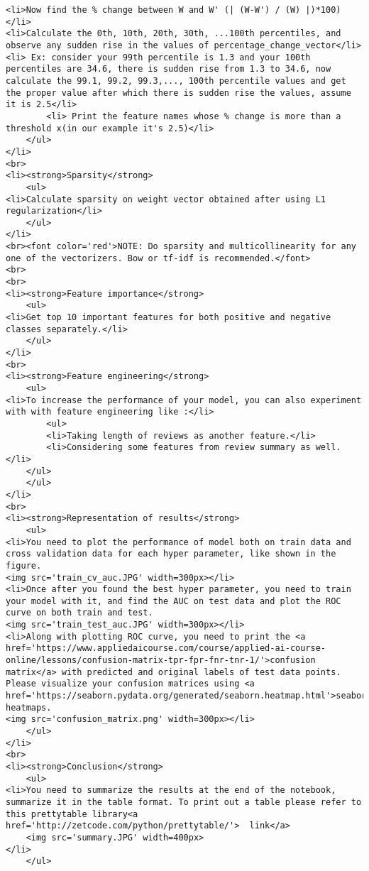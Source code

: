 \documentclass[11pt]{article}
\begin{document}
\begin{verbatim}
<li>Now find the % change between W and W' (| (W-W') / (W) |)*100)</li>
<li>Calculate the 0th, 10th, 20th, 30th, ...100th percentiles, and observe any sudden rise in the values of percentage_change_vector</li>
<li> Ex: consider your 99th percentile is 1.3 and your 100th percentiles are 34.6, there is sudden rise from 1.3 to 34.6, now calculate the 99.1, 99.2, 99.3,..., 100th percentile values and get the proper value after which there is sudden rise the values, assume it is 2.5</li>
        <li> Print the feature names whose % change is more than a threshold x(in our example it's 2.5)</li>
    </ul>
</li>
<br>
<li><strong>Sparsity</strong>
    <ul>
<li>Calculate sparsity on weight vector obtained after using L1 regularization</li>
    </ul>
</li>
<br><font color='red'>NOTE: Do sparsity and multicollinearity for any one of the vectorizers. Bow or tf-idf is recommended.</font>
<br>
<br>
<li><strong>Feature importance</strong>
    <ul>
<li>Get top 10 important features for both positive and negative classes separately.</li>
    </ul>
</li>
<br>
<li><strong>Feature engineering</strong>
    <ul>
<li>To increase the performance of your model, you can also experiment with with feature engineering like :</li>
        <ul>
        <li>Taking length of reviews as another feature.</li>
        <li>Considering some features from review summary as well.</li>
    </ul>
    </ul>
</li>
<br>
<li><strong>Representation of results</strong>
    <ul>
<li>You need to plot the performance of model both on train data and cross validation data for each hyper parameter, like shown in the figure.
<img src='train_cv_auc.JPG' width=300px></li>
<li>Once after you found the best hyper parameter, you need to train your model with it, and find the AUC on test data and plot the ROC curve on both train and test.
<img src='train_test_auc.JPG' width=300px></li>
<li>Along with plotting ROC curve, you need to print the <a href='https://www.appliedaicourse.com/course/applied-ai-course-online/lessons/confusion-matrix-tpr-fpr-fnr-tnr-1/'>confusion matrix</a> with predicted and original labels of test data points. Please visualize your confusion matrices using <a href='https://seaborn.pydata.org/generated/seaborn.heatmap.html'>seaborn heatmaps.
<img src='confusion_matrix.png' width=300px></li>
    </ul>
</li>
<br>
<li><strong>Conclusion</strong>
    <ul>
<li>You need to summarize the results at the end of the notebook, summarize it in the table format. To print out a table please refer to this prettytable library<a href='http://zetcode.com/python/prettytable/'>  link</a> 
    <img src='summary.JPG' width=400px>
</li>
    </ul>
\end{verbatim}
\end{document}
